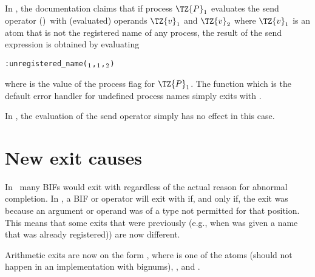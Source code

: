 \label{section:unregistered-name}

In \OldVersion, the documentation claims that if process $\TZ{P}_1$ evaluates
the send operator (\T{!})\ with
(evaluated) operands $\TZ{v}_1$ and $\TZ{v}_2$ where $\TZ{v}_1$ is an
atom that is not the registered name of any process,
the result of the send expression is obtained by evaluating
\begin{alltt}
:unregistered_name(\(\sb{1}\),\(\sb{1}\),\(\sb{2}\))
\end{alltt}
where  is the value of the  process flag for
$\TZ{P}_1$.  The function
 which is the default error handler
for undefined process names simply exits with .

In \NewVersion, the evaluation of the send operator simply has no effect
in this case.

\section{New exit causes}

\label{section:new-exits}

In \OldVersion\ many BIFs would exit with  regardless of the actual
reason for abnormal completion.  In \NewVersion, a BIF or operator will exit
with  if, and only if, the exit was because an argument or operand was
of a type not permitted for that position.  This means that some exits that
were previously  (e.g., when  was given a name that
was already registered)) are now different.  

Arithmetic exits are now on the form , where  is one of
the atoms  (should not happen in an implementation with
bignums), ,  and .
